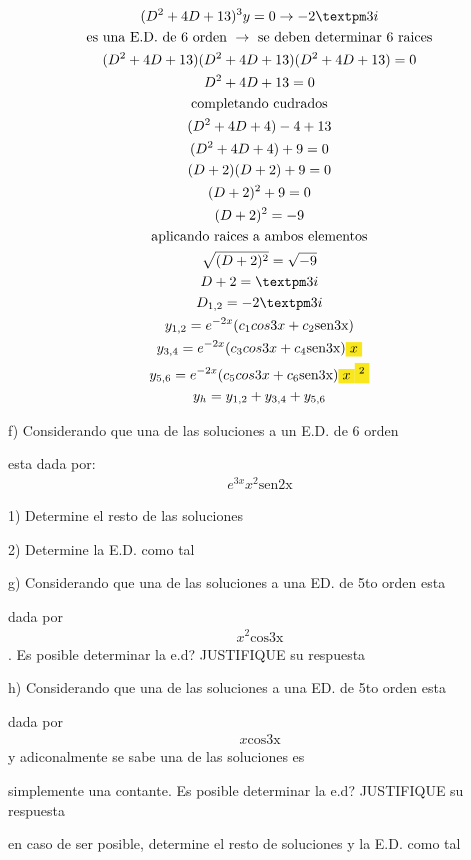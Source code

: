 \documentclass{article}
\begin{document}
\begin{gather*}
(D^{2}+4D+13)^{3}y=0   \rightarrow  -2±3i \\
\text{es una E.D. de 6 orden } \rightarrow \text{ se deben determinar 6 raices} \\
(D^{2}+4D+13)(D^{2}+4D+13)(D^{2}+4D+13)=0 \\
D^{2}+4D+13 =0 \\
\text{completando cudrados} \\
(D^{2}+4D+4)-4 +13 \\
(D^{2}+4D+4)+9 =0 \\
(D+ 2)(D+2) +9 =0 \\
(D+ 2)^{2}+9 =0 \\
(D+ 2)^{2} = -9 \\
\text{aplicando raices a ambos elementos} \\
\sqrt{(D+ 2)^{2}}= \sqrt{-9} \\
D+ 2 =±3i \\
D_{1,2} = -2±3i \\
y_{1,2}=e^{-2x}(c_{1}cos3x+c_{2}\text{sen3x}) \\
y_{3,4}=e^{-2x}(c_{3}cos3x+c_{4}\text{sen3x})\text{\colorbox[RGB]{248,231,28}{$x$}} \\
y_{5,6}=e^{-2x}(c_{5}cos3x+c_{6}\text{sen3x})\text{\colorbox[RGB]{248,231,28}{$x$}}\text{\colorbox[RGB]{248,231,28}{$^{2}$}} \\
y_{h} =y_{1,2}+ y_{3,4}+y_{5,6}
\end{gather*}


f) Considerando que una de las soluciones a un E.D. de 6 orden 

esta dada por: 
\begin{gather*}
e^{3x}x^{2}\text{sen2x}
\end{gather*}


1) Determine el resto de las soluciones

2) Determine la E.D. como tal



g) Considerando que una de las soluciones a una ED. de 5to orden esta 

dada por 
\begin{gather*}
x^{2}\text{cos3x}
\end{gather*}
. Es posible determinar la e.d? JUSTIFIQUE su respuesta



h) Considerando que una de las soluciones a una ED. de 5to orden esta 

dada por 
\begin{gather*}
x\text{cos3x}
\end{gather*}
 y adiconalmente se sabe una de las soluciones es

simplemente una contante. Es posible determinar la e.d? JUSTIFIQUE su respuesta

en caso de ser posible, determine el resto de soluciones y la E.D. como tal
\end{document}
